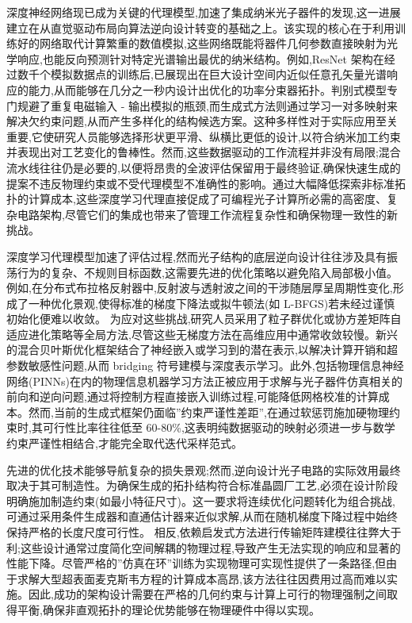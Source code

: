 深度神经网络现已成为关键的代理模型,加速了集成纳米光子器件的发现,这一进展建立在从直觉驱动布局向算法逆向设计转变的基础之上。该实现的核心在于利用训练好的网络取代计算繁重的数值模拟,这些网络既能将器件几何参数直接映射为光学响应,也能反向预测针对特定光谱输出最优的纳米结构。例如,ResNet 架构在经过数千个模拟数据点的训练后,已展现出在巨大设计空间内近似任意孔矢量光谱响应的能力,从而能够在几分之一秒内设计出优化的功率分束器拓扑。判别式模型专门规避了重复电磁输入 - 输出模拟的瓶颈,而生成式方法则通过学习一对多映射来解决欠约束问题,从而产生多样化的结构候选方案。这种多样性对于实际应用至关重要,它使研究人员能够选择形状更平滑、纵横比更低的设计,以符合纳米加工约束并表现出对工艺变化的鲁棒性。然而,这些数据驱动的工作流程并非没有局限;混合流水线往往仍是必要的,以便将昂贵的全波评估保留用于最终验证,确保快速生成的提案不违反物理约束或不受代理模型不准确性的影响。通过大幅降低探索非标准拓扑的计算成本,这些深度学习代理直接促成了可编程光子计算所必需的高密度、复杂电路架构,尽管它们的集成也带来了管理工作流程复杂性和确保物理一致性的新挑战。\citep{doi_10_1038_s41598_018_37952_2_076b64f9} \citep{doi_10_29026_oes_2022_210012_27973a69} \citep{doi_10_1109_access_2026_3697666_bd5258a6}

深度学习代理模型加速了评估过程,然而光子结构的底层逆向设计往往涉及具有振荡行为的复杂、不规则目标函数,这需要先进的优化策略以避免陷入局部极小值。例如,在分布式布拉格反射器中,反射波与透射波之间的干涉随层厚呈周期性变化,形成了一种优化景观,使得标准的梯度下降法或拟牛顿法(如 L-BFGS)若未经过谨慎初始化便难以收敛。\citep{doi_10_1515_nanoph_2020_0379_1cc596ab} 为应对这些挑战,研究人员采用了粒子群优化或协方差矩阵自适应进化策略等全局方法,尽管这些无梯度方法在高维应用中通常收敛较慢。新兴的混合贝叶斯优化框架结合了神经嵌入或学习到的潜在表示,以解决计算开销和超参数敏感性问题,从而 bridging 符号建模与深度表示学习。此外,包括物理信息神经网络(PINNs)在内的物理信息机器学习方法正被应用于求解与光子器件仿真相关的前向和逆向问题,通过将控制方程直接嵌入训练过程,可能降低网格校准的计算成本。然而,当前的生成式框架仍面临''约束严谨性差距'',在通过软惩罚施加硬物理约束时,其可行性比率往往低至 60-80\%,这表明纯数据驱动的映射必须进一步与数学约束严谨性相结合,才能完全取代迭代采样范式。\citep{doi_10_48550_arxiv_2602_18148_e9c0a72b} \citep{doi_10_48550_arxiv_2511_00070_bf8eda11} \citep{doi_10_48550_arxiv_2606_12337_68b62bfa}

先进的优化技术能够导航复杂的损失景观;然而,逆向设计光子电路的实际效用最终取决于其可制造性。为确保生成的拓扑结构符合标准晶圆厂工艺,必须在设计阶段明确施加制造约束(如最小特征尺寸)。这一要求将连续优化问题转化为组合挑战,可通过采用条件生成器和直通估计器来近似求解,从而在随机梯度下降过程中始终保持严格的长度尺度可行性。\citep{doi_10_1021_acsphotonics_2c00313_0d7d39c3} 相反,依赖启发式方法进行传输矩阵建模往往弊大于利;这些设计通常过度简化空间解耦的物理过程,导致产生无法实现的响应和显著的性能下降。尽管严格的''仿真在环''训练为实现物理可实现性提供了一条路径,但由于求解大型超表面麦克斯韦方程的计算成本高昂,该方法往往因费用过高而难以实施。因此,成功的架构设计需要在严格的几何约束与计算上可行的物理强制之间取得平衡,确保非直观拓扑的理论优势能够在物理硬件中得以实现。\citep{doi_10_1021_acsphotonics_2c00313_0d7d39c3} \citep{doi_10_48550_arxiv_2505_18377_a6fc9ec3}

